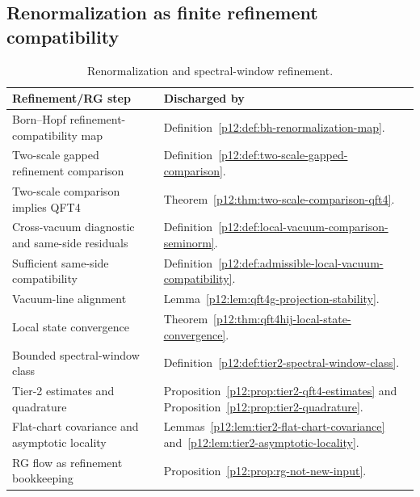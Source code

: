 \documentclass[12pt,a4paper]{article}
\begin{document}
\subsection{Renormalization as finite refinement compatibility}
\label{p12:sec:renormalization}


\begin{table}[htbp]
\centering
\small
\begin{tabularx}{\textwidth}{@{}
>{\raggedright\arraybackslash}p{}
>{\raggedright\arraybackslash}X
@{}}
\toprule
\textbf{Refinement/RG step} & \textbf{Discharged by} \\
\midrule
Born--Hopf refinement-compatibility map
& Definition~\ref{p12:def:bh-renormalization-map}. \\

Two-scale gapped refinement comparison
& Definition~\ref{p12:def:two-scale-gapped-comparison}. \\

Two-scale comparison implies QFT4
& Theorem~\ref{p12:thm:two-scale-comparison-qft4}. \\

Cross-vacuum diagnostic and same-side residuals
& Definition~\ref{p12:def:local-vacuum-comparison-seminorm}. \\

Sufficient same-side compatibility
& Definition~\ref{p12:def:admissible-local-vacuum-compatibility}. \\

Vacuum-line alignment
& Lemma~\ref{p12:lem:qft4g-projection-stability}. \\

Local state convergence
& Theorem~\ref{p12:thm:qft4hij-local-state-convergence}. \\

Bounded spectral-window class
& Definition~\ref{p12:def:tier2-spectral-window-class}. \\

Tier-2 estimates and quadrature
& Proposition~\ref{p12:prop:tier2-qft4-estimates} and
Proposition~\ref{p12:prop:tier2-quadrature}. \\

Flat-chart covariance and asymptotic locality
& Lemmas~\ref{p12:lem:tier2-flat-chart-covariance}
and~\ref{p12:lem:tier2-asymptotic-locality}. \\

RG flow as refinement bookkeeping
& Proposition~\ref{p12:prop:rg-not-new-input}. \\
\bottomrule
\end{tabularx}
\caption[Renormalization and spectral-window refinement]{Renormalization and spectral-window refinement.}
\label{p12:tab:renormalization-spectral-window-ledger}
\end{table}
\end{document}
